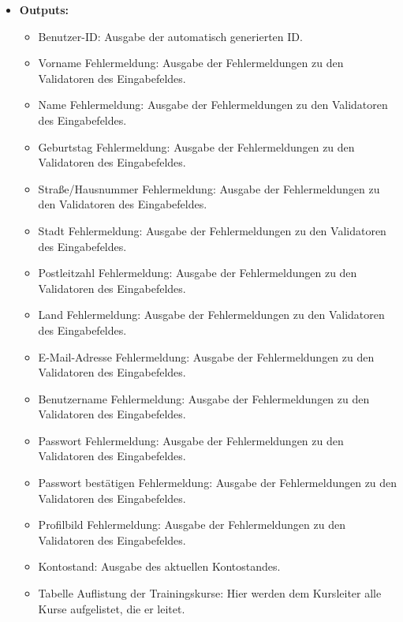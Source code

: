 \begin{itemize}
				
			\item \textbf{Outputs:}
				\begin{itemize}
					\item Benutzer-ID: Ausgabe der automatisch generierten ID.
					\item Vorname Fehlermeldung: Ausgabe der Fehlermeldungen zu den Validatoren des Eingabefeldes.
					\item Name Fehlermeldung: Ausgabe der Fehlermeldungen zu den Validatoren des Eingabefeldes.
					\item Geburtstag Fehlermeldung: Ausgabe der Fehlermeldungen zu den Validatoren des Eingabefeldes.
					\item Straße/Hausnummer Fehlermeldung: Ausgabe der Fehlermeldungen zu den Validatoren des Eingabefeldes.
					\item Stadt Fehlermeldung: Ausgabe der Fehlermeldungen zu den Validatoren des Eingabefeldes.
					\item Postleitzahl Fehlermeldung: Ausgabe der Fehlermeldungen zu den Validatoren des Eingabefeldes.
					\item Land Fehlermeldung: Ausgabe der Fehlermeldungen zu den Validatoren des Eingabefeldes.
					\item E-Mail-Adresse Fehlermeldung: Ausgabe der Fehlermeldungen zu den Validatoren des Eingabefeldes.
					\item Benutzername Fehlermeldung: Ausgabe der Fehlermeldungen zu den Validatoren des Eingabefeldes.
					\item Passwort Fehlermeldung: Ausgabe der Fehlermeldungen zu den Validatoren des Eingabefeldes.
					\item Passwort bestätigen Fehlermeldung: Ausgabe der Fehlermeldungen zu den Validatoren des Eingabefeldes.
					\item Profilbild Fehlermeldung: Ausgabe der Fehlermeldungen zu den Validatoren des Eingabefeldes.
					\item Kontostand: Ausgabe des aktuellen Kontostandes.
					\item Tabelle Auflistung der Trainingskurse: Hier werden dem Kursleiter alle Kurse aufgelistet, die er leitet.
				\end{itemize}
				
				\begin{center}
					\begin{longtable}{|p{5cm} | p{4cm}|p{3cm}|}
						

\end{longtable}
\end{center}
\end{itemize}
